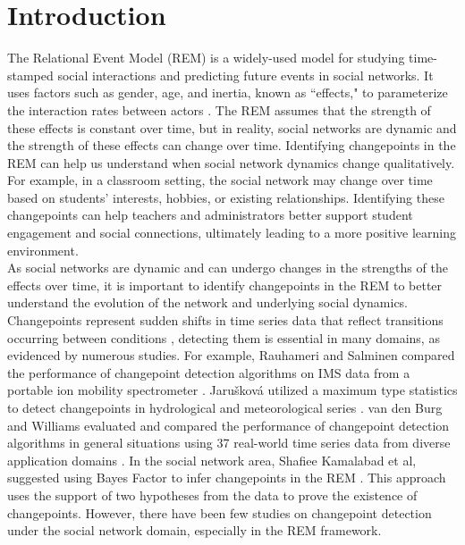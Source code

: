 \documentclass[]{interact}
\theoremstyle{plain}%
\theoremstyle{definition}
\theoremstyle{remark}
\begin{document}
	\newpage


	\section{\fontsize{14}{15}\selectfont Introduction} \label{sec:intro}
	
	\hspace{0.2cm} The Relational Event Model (REM) is a widely-used model for studying time-stamped social interactions and predicting future events in social networks. It uses factors such as gender, age, and inertia, known as ``effects," to parameterize the interaction rates between actors \cite{buttsRelationalEventFramework2008}. The REM assumes that the strength of these effects is constant over time, but in reality, social networks are dynamic and the strength of these effects can change over time. Identifying changepoints in the REM can help us understand when social network dynamics change qualitatively. For example, in a classroom setting, the social network may change over time based on students' interests, hobbies, or existing relationships. Identifying these changepoints can help teachers and administrators better support student engagement and social connections, ultimately leading to a more positive learning environment. \\
	
	As social networks are dynamic and can undergo changes in the strengths of the effects over time, it is important to identify changepoints in the REM to better understand the evolution of the network and underlying social dynamics. Changepoints represent sudden shifts in time series data that reflect transitions occurring between conditions \cite{sharmaTrendAnalysisChange2016}\cite{aminikhanghahiSurveyMethodsTime2017}, detecting them is essential in many domains, as evidenced by numerous studies. For example, Rauhameri and Salminen compared the performance of changepoint detection algorithms on IMS data from a portable ion mobility spectrometer \cite{rauhameriComparisonOnlineMethods2022}. Jarušková utilized a maximum type statistics to detect changepoints in hydrological and meteorological series \cite{jaruskovaProblemsApplicationChangePoint1997}. van den Burg and Williams evaluated and compared the performance of changepoint detection algorithms in general situations using 37 real-world time series data from diverse application domains \cite{burgEvaluationChangePoint2022}. In the social network area, Shafiee Kamalabad et al, suggested using Bayes Factor to infer changepoints in the REM \cite{shafieekamalabadWhatPointChange2023}. This approach uses the support of two hypotheses from the data to prove the existence of changepoints. However, there have been few studies on changepoint detection under the social network domain, especially in the REM framework. \\
	
\end{document}
